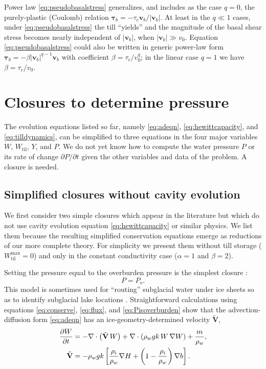 \documentclass[gmd]{copernicus}   %
\begin{document}
Power law \eqref{eq:pseudobasalstress} generalizes, and includes as the case $q=0$, the purely-plastic (Coulomb) relation $\boldsymbol\tau_b = - \tau_c \mathbf{v}_b/|\mathbf{v}_b|$.  At least in the $q\ll 1$ cases, under \eqref{eq:pseudobasalstress} the till ``yields'' and the magnitude of the basal shear stress becomes nearly independent of $|\mathbf{v}_b|$, when $|\mathbf{v}_b| \gg v_0$.  Equation \eqref{eq:pseudobasalstress} could also be written in generic power-law form $\boldsymbol\tau_b = - \beta |\mathbf{v}_b|^{q-1} \mathbf{v}_b$ with coefficient $\beta = \tau_c / v_0^q$; in the linear case $q=1$ we have $\beta = \tau_c/v_0$.


\section{Closures to determine pressure} \label{sec:closures}

The evolution equations listed so far, namely \eqref{eq:adeqn}, \eqref{eq:hewittcapacity}, and \eqref{eq:tilldynamics}, can be simplified to three equations in the four major variables $W$, $W_{\text{til}}$, $Y$, and $P$.  We do not yet know how to compute the water pressure $P$ or its rate of change $\partial P/\partial t$ given the other variables and data of the problem.  A closure is needed.

\subsection{Simplified closures without cavity evolution}  \label{subsec:simplifiedclosures}  We first consider two simple closures which appear in the literature but which do not use cavity evolution equation \eqref{eq:hewittcapacity} or similar physics.  We list them because the resulting simplified conservation equations emerge as reductions of our more complete theory.  For simplicity we present them without till storage ($W_{\text{til}}^{\text{max}}=0$) and only in the constant conductivity case ($\alpha=1$ and $\beta=2$).

Setting the pressure equal to the overburden pressure is the simplest closure \citep{LeBrocqetal2009,Shreve1972}:
\begin{equation}
P = P_o.\label{eq:Pisoverburden}
\end{equation}
This model is sometimes used for ``routing'' subglacial water under ice sheets so as to identify subglacial lake locations \citep{Goeller2014,Livingstoneetal2013,Siegertetal2009}.  Straightforward calculations using equations \eqref{eq:conserve}, \eqref{eq:flux}, and \eqref{eq:Pisoverburden} show that the advection-diffusion form \eqref{eq:adeqn} has an ice-geometry-determined velocity $\tilde{\mathbf{V}}$,
\begin{align}
  \frac{\partial W}{\partial t} &= - \nabla\cdot\left(\tilde{\mathbf{V}}\, W\right) + \nabla\cdot\left(\rho_w g k \,W\, \nabla W\right) + \frac{m}{\rho_w},   \label{eq:PisoverConservation} \\
\tilde{\mathbf{V}} &= - \rho_w g k \left[\frac{\rho_i}{\rho_w} \nabla H + \left(1-\frac{\rho_i}{\rho_w}\right) \nabla b\right]. \notag
\end{align}
\end{document}
